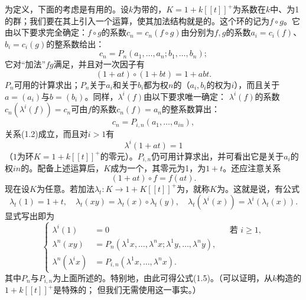 为定义，下面的考虑是有用的。设$k$为带的，$K=1+k[[t]]^+$为系数在$k$中、为1的群；我们要在其上引入一个运算，使其加法结构就是的。这个环的记为$f\circ g$。它由以下要求完全确定：$f\circ g$的系数$c_n=c_n(f\circ g)$由分别为$f,g$的系数$a_i=c_i(f)$、$b_i=c_i(g)$的整系数给出：
\begin{equation}c_n=P_n(a_1,\ldots,a_n;b_1,\ldots,b_n);\tag{1.6}\end{equation}
它对“加法”$fg$满足，并且对一次因子有
\begin{equation}(1+at)\circ(1+bt)=1+abt.\tag{1.7}\end{equation}
$P_n$可用的计算求出；$P_n$关于$a_i$和关于$b_i$都为权$n$的（$a_i,b_i$的权为$i$），而且关于$a=(a_i)$与$b=(b_i)$。同样，$\lambda^i(f)$由以下要求唯一确定：
$\lambda^i(f)$的系数$c_n(\lambda^i(f))=c_n$可由$f$的系数$c_n(f)=a_n$的整系数算出：
\begin{equation}c_n=P_{i,n}(a_1,\ldots,a_{in}),\tag{1.8}\end{equation}
关系(1.2)成立，而且对$i>1$有
\begin{equation}\lambda^i(1+at)=1\tag{1.9}\end{equation}
（$1$为环$K=1+k[[t]]^+$的零元）。$P_{i,n}$仍可用计算求出，并可看出它是关于$a_i$的权$in$的。配备上述运算后，$K$成为一个，其零元为1，为$1+t$。还应注意关系
\begin{equation}(1+at)\circ f=f(at).\tag{1.7 bis}\end{equation}
现在设$K$为任意。若加法$\lambda_t:K\to1+K[[t]]^+$为，就称$K$为。这就是说，有公式
\begin{equation}
\lambda_t(1)=1+t,\quad\lambda_t(xy)=\lambda_t(x)\circ\lambda_t(y),\quad
\lambda_t(\lambda^i(x))=\lambda^i(\lambda_t(x)).\tag{1.10}
\end{equation}
显式写出即为
\begin{equation}\left\{\begin{aligned}
\lambda^i(1)&=0&&\text{若 }i\geq1,\\
\lambda^n(xy)&=P_n(\lambda^1x,\ldots,\lambda^nx;\lambda^1y,\ldots,\lambda^ny),\\
\lambda^n(\lambda^ix)&=P_{i,n}(\lambda^1x,\ldots,\lambda^nx).
\end{aligned}\right.\tag{1.11}\end{equation}
其中$P_n$与$P_{i,n}$为上面所述的。特别地，由此可得公式(1.5)。（可以证明，从$k$构造的$1+k[[t]]^+$是特殊的； 但我们无需使用这一事实。）

